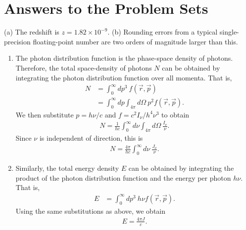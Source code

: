 \chapter{Answers to the Problem Sets}

\newslide
\problemset

\newslide

\begin{problem}
(a) The redshift is $z = 1.82 \times 10^{-9}$. (b) Rounding errors from a
typical single-precision floating-point number are two orders
of magnitude larger than this.
\end{problem}

\newslide

\begin{problem}
\begin{enumerate}
\item[(a)] The photon distribution function is the phase-space density
  of photons. Therefore, the total space-density of photons $N$ can be
  obtained by integrating the photon distribution function over all
  momenta. That is,
\begin{align}
N &= \int_0^\infty\!\!\!dp^3\:f(\vec r,\vec p)\\
  &= \int_0^\infty\!\!\!dp \int_{4\pi}\!\!\! d\Omega\: p^2 f(\vec r,\vec p).
\end{align}
We then substitute $p = h\nu/c$ and $f = c^2I_\nu/h^4\nu^3$ to obtain
\begin{align}
N = \frac{1}{h c} 
\int_0^\infty\!\!\!d\nu\int_{4\pi}\!\!\!d\Omega\:\frac{I_\nu}{\nu}.
\end{align}
Since $\nu$ is independent of direction, this is
\begin{align}
N = \frac{4\pi}{h c} \int_0^\infty\!\!\!d\nu\:\frac{J_\nu}{\nu}.
\end{align}
\item[(b)] Similarly, the total energy density $E$ can be obtained by
  integrating the product of the photon distribution function and the
  energy per photon $h\nu$. That is,
\begin{align}
E &= \int_0^\infty\!\!\!dp^3\:h\nu f(\vec r,\vec p).
\end{align}
Using the same substitutions as above, we obtain
\begin{align}
E = \frac{4\pi J}{c}.
\end{align}

\end{enumerate}
\end{problem}

